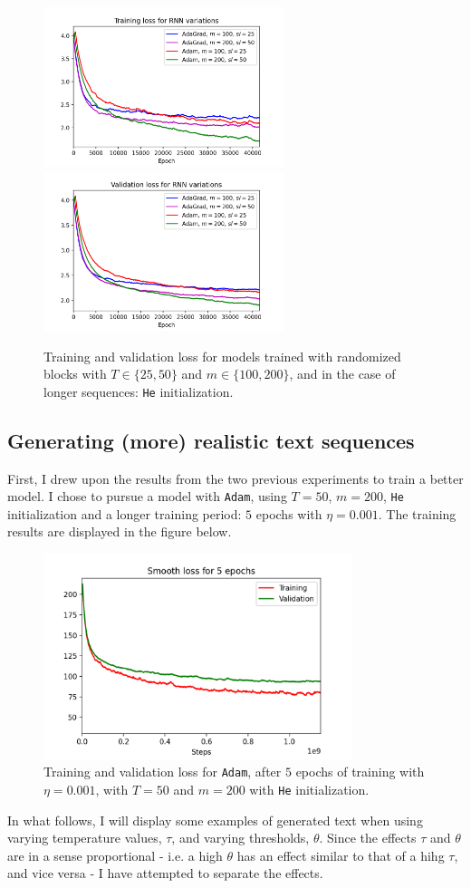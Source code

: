 \documentclass{article}
\begin{document}
	\begin{figure}[h!]
		\centering
		\includegraphics[width=7cm]{../plots/loss_train_comp_rnn.png}
		\includegraphics[width=7cm]{../plots/loss_val_comp_rnn.png}
		\caption{Training and validation loss for models trained with randomized blocks with $T \in \{25, 50\}$ and $m \in \{100, 200\}$, and in the case of longer sequences: \texttt{He} initialization.}
 	\end{figure}

\newpage
\subsection*{Generating (more) realistic text sequences}
	First, I drew upon the results from the two previous experiments to train a better model. I chose to pursue a model with \texttt{Adam}, using $T=50$, $m=200$, \texttt{He} initialization and a longer training period: $5$ epochs with $\eta = 0.001$. The training results are displayed in the figure below.
	\begin{figure}[h!]
		\centering
		\includegraphics[width=9cm]{../plots/rnn_loss_v7.png}
		\caption{Training and validation loss for \texttt{Adam}, after $5$ epochs of training with $\eta = 0.001$, with $T = 50$ and $m = 200$ with \texttt{He} initialization.}
 	\end{figure}
	In what follows, I will display some examples of generated text when using varying temperature values, $\tau$, and varying thresholds, $\theta$. Since the effects $\tau$ and $\theta$ are in a sense proportional - i.e. a high $\theta$ has an effect similar to that of a hihg $\tau$, and vice versa - I have attempted to separate the effects.
\end{document}
